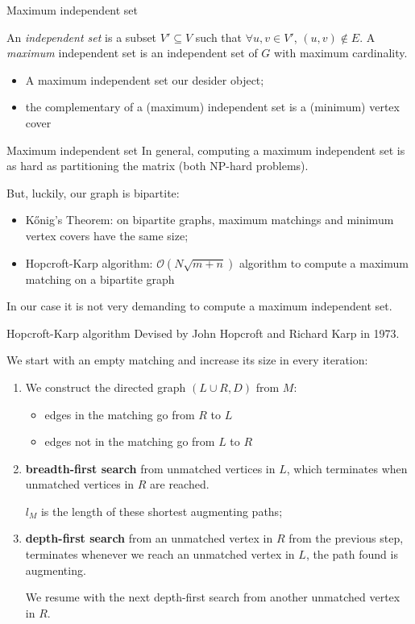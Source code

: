 \begin{frame}{Maximum independent set}
 \begin{definition}
		An \emph{independent set} is a subset $V' \subseteq V$ such that $ \forall u,v \in V'$, $(u,v) \notin E$.
	A \emph{maximum} independent set is an independent set of $G$ with maximum cardinality. 
 \end{definition}

\begin{itemize}
	\item A maximum independent set our desider object;
	\item the complementary of a (maximum) independent set is a (minimum) vertex cover
\end{itemize}

\end{frame}

\begin{frame}{Maximum independent set}
	In general, computing a maximum independent set is as hard as partitioning the matrix (both NP-hard problems).

But, luckily, our graph is bipartite:

	\begin{itemize}
		\item K\H{o}nig's Theorem: on bipartite graphs, maximum matchings and minimum vertex covers have the same size;
		\item Hopcroft-Karp algorithm: $\mathcal{O}\left(N\sqrt{m+n}\right)$ algorithm to compute a maximum matching on a bipartite graph
	\end{itemize}

In our case it is not very demanding to compute a maximum independent set.

\end{frame}

\begin{frame}{Hopcroft-Karp algorithm}
Devised by John Hopcroft and Richard Karp in 1973.

We start with an empty matching and increase its size in every iteration:

\begin{enumerate}
\item We construct the directed graph $(L \cup R, D)$ from $M$:
\begin{itemize}
	\item edges in the matching go from $R$ to $L$
	\item edges not in the matching go from $L$ to $R$
\end{itemize}
\item \textbf{breadth-first search} from unmatched vertices in $L$, which terminates when unmatched vertices in $R$ are reached. 

	$l_M$ is the length of these shortest augmenting paths;
\item \textbf{depth-first search} from an unmatched vertex in $R$ from the previous step, terminates whenever we reach an unmatched vertex in $L$, the path found is augmenting. 
	
We resume with the next depth-first search from another unmatched vertex in $R$.
\end{enumerate}
\end{frame}

